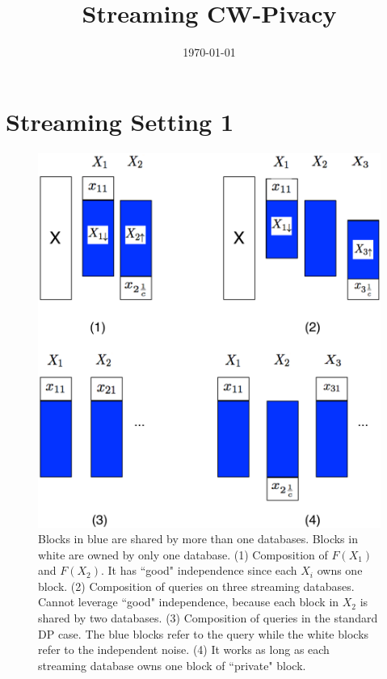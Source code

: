 \documentclass[11pt]{article}
\title{Streaming CW-Pivacy}
\date{\today}
\begin{document}
\maketitle
\section{Streaming Setting 1}
\begin{figure}[th]
\centering
\includegraphics[width=4.8in]{fig/stream_database1.pdf}
\caption{\label{stream_db1} Blocks in blue are shared by more than one databases. Blocks in white are owned by only one database. (1) Composition of $F(X_{1})$ and $F(X_{2})$. It has ``good" independence since each $X_{i}$ owns one block. (2) Composition of queries on three streaming databases. Cannot leverage ``good" independence, because each block in $X_{2}$ is shared by two databases. (3) Composition of queries in the standard DP case. The blue blocks refer to the query while the white blocks refer to the independent noise. (4) It works as long as each streaming database owns one block of ``private" block.}
\end{figure}
\end{document}
